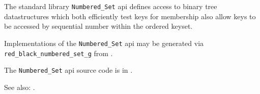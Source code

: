 
The standard library {\tt Numbered\_Set} api defines access to binary tree 
datastructures which both efficiently test keys for membership also allow keys to 
be accessed by sequential number within the ordered keyset.

Implementations of the {\tt Numbered\_Set} api may be generated 
via {\tt red\_black\_numbered\_set\_g} from 
.

The {\tt Numbered\_Set} api source code is in .

See also:  .

